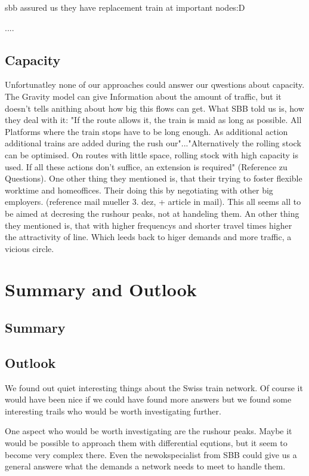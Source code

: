 \documentclass[11pt]{article}
\begin{document}
 sbb assured us they have replacement train at important nodes:D

....

\subsection{Capacity}

Unfortunatley none of our approaches could answer our qwestions about capacity. The Gravity model can give Information about the amount of traffic, but it doesn't tells anithing about how big this flows can get. What SBB told us is, how they deal with it: "If the route allows it, the train is maid as long as possible. All Platforms where the train stops have to be long enough. As additional action additional trains are added during the rush our"..."Alternatively the rolling stock can be optimised. On routes with little space, rolling stock with high capacity is used. If all these actions don't suffice, an extension is required" (Reference zu Questions). One other thing they mentioned is, that their trying to foster flexible worktime and homeoffices. Their doing this by negotiating with other big employers. (reference mail mueller 3. dez, + article in mail). This all seems all to be aimed at decresing the rushour peaks, not at handeling them. An other thing they mentioned is, that with higher frequencys and shorter travel times higher the attractivity of line. Which leeds back to higer demands and more traffic, a vicious circle.




\section{Summary and Outlook}
\subsection{Summary}






\subsection{Outlook}
We found out quiet interesting things about the Swiss train network. Of course it would have been nice if we could have found more answers but we found some interesting trails who would be worth investigating further.\newline

One aspect who would be worth investigating are the rushour peaks. Maybe it would be possible to approach them with differential equtions, but it seem to become very complex there. Even the newokspecialist from SBB could give us a general answere what the demands a network needs to meet to handle them.
\end{document}

